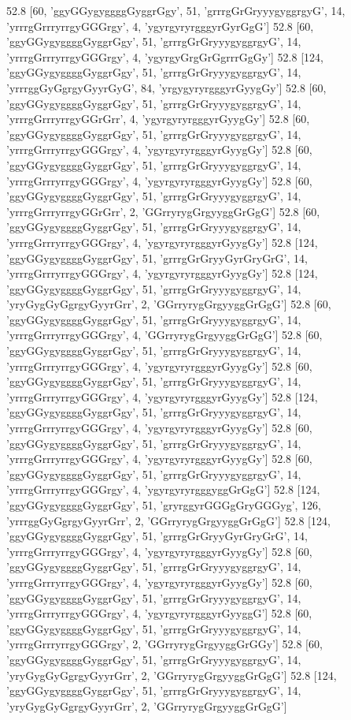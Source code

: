 52.8 [60, 'ggyGGygyggggGyggrGgy', 51, 'grrrgGrGryyygyggrgyG', 14, 'yrrrgGrrryrrgyGGGrgy', 4, 'ygyrgyryrgggyrGyrGgG']
52.8 [60, 'ggyGGygyggggGyggrGgy', 51, 'grrrgGrGryyygyggrgyG', 14, 'yrrrgGrrryrrgyGGGrgy', 4, 'ygyrgyGrgGrGgrrrGgGy']
52.8 [124, 'ggyGGygyggggGyggrGgy', 51, 'grrrgGrGryyygyggrgyG', 14, 'yrrrggGyGgrgyGyyrGyG', 84, 'yrgygyryrgggyrGyygGy']
52.8 [60, 'ggyGGygyggggGyggrGgy', 51, 'grrrgGrGryyygyggrgyG', 14, 'yrrrgGrrryrrgyGGrGrr', 4, 'ygyrgyryrgggyrGyygGy']
52.8 [60, 'ggyGGygyggggGyggrGgy', 51, 'grrrgGrGryyygyggrgyG', 14, 'yrrrgGrrryrrgyGGGrgy', 4, 'ygyrgyryrgggyrGyygGy']
52.8 [60, 'ggyGGygyggggGyggrGgy', 51, 'grrrgGrGryyygyggrgyG', 14, 'yrrrgGrrryrrgyGGGrgy', 4, 'ygyrgyryrgggyrGyygGy']
52.8 [60, 'ggyGGygyggggGyggrGgy', 51, 'grrrgGrGryyygyggrgyG', 14, 'yrrrgGrrryrrgyGGrGrr', 2, 'GGrryrygGrgyyggGrGgG']
52.8 [60, 'ggyGGygyggggGyggrGgy', 51, 'grrrgGrGryyygyggrgyG', 14, 'yrrrgGrrryrrgyGGGrgy', 4, 'ygyrgyryrgggyrGyygGy']
52.8 [124, 'ggyGGygyggggGyggrGgy', 51, 'grrrgGrGryyGyrGryGrG', 14, 'yrrrgGrrryrrgyGGGrgy', 4, 'ygyrgyryrgggyrGyygGy']
52.8 [124, 'ggyGGygyggggGyggrGgy', 51, 'grrrgGrGryyygyggrgyG', 14, 'yryGygGyGgrgyGyyrGrr', 2, 'GGrryrygGrgyyggGrGgG']
52.8 [60, 'ggyGGygyggggGyggrGgy', 51, 'grrrgGrGryyygyggrgyG', 14, 'yrrrgGrrryrrgyGGGrgy', 4, 'GGrryrygGrgyyggGrGgG']
52.8 [60, 'ggyGGygyggggGyggrGgy', 51, 'grrrgGrGryyygyggrgyG', 14, 'yrrrgGrrryrrgyGGGrgy', 4, 'ygyrgyryrgggyrGyygGy']
52.8 [60, 'ggyGGygyggggGyggrGgy', 51, 'grrrgGrGryyygyggrgyG', 14, 'yrrrgGrrryrrgyGGGrgy', 4, 'ygyrgyryrgggyrGyygGy']
52.8 [124, 'ggyGGygyggggGyggrGgy', 51, 'grrrgGrGryyygyggrgyG', 14, 'yrrrgGrrryrrgyGGGrgy', 4, 'ygyrgyryrgggyrGyygGy']
52.8 [60, 'ggyGGygyggggGyggrGgy', 51, 'grrrgGrGryyygyggrgyG', 14, 'yrrrgGrrryrrgyGGGrgy', 4, 'ygyrgyryrgggyrGyygGy']
52.8 [60, 'ggyGGygyggggGyggrGgy', 51, 'grrrgGrGryyygyggrgyG', 14, 'yrrrgGrrryrrgyGGGrgy', 4, 'ygyrgyryrgggyggGrGgG']
52.8 [124, 'ggyGGygyggggGyggrGgy', 51, 'gryrggyrGGGgGryGGGyg', 126, 'yrrrggGyGgrgyGyyrGrr', 2, 'GGrryrygGrgyyggGrGgG']
52.8 [124, 'ggyGGygyggggGyggrGgy', 51, 'grrrgGrGryyGyrGryGrG', 14, 'yrrrgGrrryrrgyGGGrgy', 4, 'ygyrgyryrgggyrGyygGy']
52.8 [60, 'ggyGGygyggggGyggrGgy', 51, 'grrrgGrGryyygyggrgyG', 14, 'yrrrgGrrryrrgyGGGrgy', 4, 'ygyrgyryrgggyrGyygGy']
52.8 [60, 'ggyGGygyggggGyggrGgy', 51, 'grrrgGrGryyygyggrgyG', 14, 'yrrrgGrrryrrgyGGGrgy', 4, 'ygyrgyryrgggyrGyyggG']
52.8 [60, 'ggyGGygyggggGyggrGgy', 51, 'grrrgGrGryyygyggrgyG', 14, 'yrrrgGrrryrrgyGGGrgy', 2, 'GGrryrygGrgyyggGrGGy']
52.8 [60, 'ggyGGygyggggGyggrGgy', 51, 'grrrgGrGryyygyggrgyG', 14, 'yryGygGyGgrgyGyyrGrr', 2, 'GGrryrygGrgyyggGrGgG']
52.8 [124, 'ggyGGygyggggGyggrGgy', 51, 'grrrgGrGryyygyggrgyG', 14, 'yryGygGyGgrgyGyyrGrr', 2, 'GGrryrygGrgyyggGrGgG']
